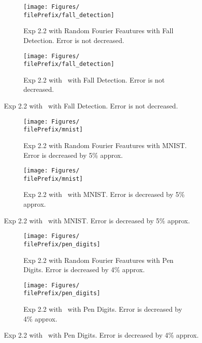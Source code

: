 \begin{figure}[H]
  \centering
  \renewcommand{\filePrefix}{\undPrefix/rff}
  \begin{subfigure}[t]{0.5\linewidth}
    \centering\captionsetup{width=.8\linewidth}\texttt{[image: Figures/\\filePrefix/fall\_detection]}
    \caption{Exp 2.2 with Random Fourier Feautures with Fall Detection. Error is not decreased.}
    \label{fig:\undPrefix_fall_detection}
  \end{subfigure}%
  \renewcommand{\filePrefix}{\undPrefix/nys}%
  \begin{subfigure}[t]{0.5\linewidth}
    \centering\captionsetup{width=.8\linewidth}\texttt{[image: Figures/\\filePrefix/fall\_detection]}
    \caption{Exp 2.2 with \Nys\ with Fall Detection. Error is not decreased.}
    \label{fig:\undPrefix_fall_detection}
  \end{subfigure}%
\end{figure}

\begin{figure}[H]
  \centering
  \renewcommand{\filePrefix}{\undPrefix/rff}
  \begin{subfigure}[t]{0.5\linewidth}
    \centering\captionsetup{width=.8\linewidth}\texttt{[image: Figures/\\filePrefix/mnist]}
    \caption{Exp 2.2 with Random Fourier Feautures with MNIST. Error is decreased by 5\% approx.}
    \label{fig:\undPrefix_mnist}
  \end{subfigure}%
  \renewcommand{\filePrefix}{\undPrefix/nys}%
  \begin{subfigure}[t]{0.5\linewidth}
    \centering\captionsetup{width=.8\linewidth}\texttt{[image: Figures/\\filePrefix/mnist]}
    \caption{Exp 2.2 with \Nys\ with MNIST. Error is decreased by 5\% approx.}
    \label{fig:\undPrefix_mnist}
  \end{subfigure}
\end{figure}


\begin{figure}[H]
  \centering
  \renewcommand{\filePrefix}{\undPrefix/rff}
  \begin{subfigure}[t]{0.5\linewidth}
    \centering\captionsetup{width=.8\linewidth}\texttt{[image: Figures/\\filePrefix/pen\_digits]}
    \caption{Exp 2.2 with Random Fourier Feautures with Pen Digits. Error is decreased by 4\% approx.}
    \label{fig:\undPrefix_pen_digits}
  \end{subfigure}%
  \renewcommand{\filePrefix}{\undPrefix/nys}%
  \begin{subfigure}[t]{0.5\linewidth}
    \centering\captionsetup{width=.8\linewidth}\texttt{[image: Figures/\\filePrefix/pen\_digits]}
    \caption{Exp 2.2 with \Nys\ with Pen Digits. Error is decreased by 4\% approx.}
    \label{fig:\undPrefix_pen_digits}
  \end{subfigure}%
\end{figure}



